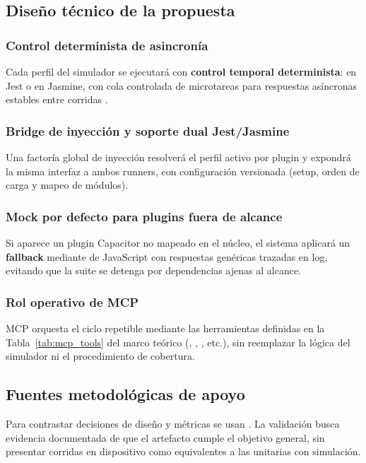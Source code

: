 \subsection{Diseño técnico de la propuesta}
\label{sec:diseno_tecnico_propuesta}
\subsubsection{Control determinista de asincronía}
\label{ssec:determinismo_asincronia}
Cada perfil del simulador se ejecutará con \textbf{control temporal determinista}:  en Jest o  en Jasmine, con cola controlada de microtareas para respuestas asíncronas estables entre corridas \cite{luo2014flaky}.

\subsubsection{Bridge de inyección y soporte dual Jest/Jasmine}
\label{ssec:bridge_inyeccion_dual}
Una factoría global de inyección resolverá el perfil activo por plugin y expondrá la misma interfaz a ambos runners, con configuración versionada (setup, orden de carga y mapeo de módulos).

\subsubsection{Mock por defecto para plugins fuera de alcance}
\label{ssec:fallback_mock}
Si aparece un plugin Capacitor no mapeado en el núcleo, el sistema aplicará un \textbf{fallback} mediante  de JavaScript con respuestas genéricas trazadas en log, evitando que la suite se detenga por dependencias ajenas al alcance.

\subsubsection{Rol operativo de MCP}
\label{ssec:justificacion_mcp_operativa}
MCP \cite{mcp-spec2025} orquesta el ciclo repetible mediante las herramientas definidas en la Tabla~\ref{tab:mcp_tools} del marco teórico (, , , etc.), sin reemplazar la lógica del simulador ni el procedimiento de cobertura.

\subsection{Fuentes metodológicas de apoyo}
\label{sec:instrumentos_biblio}
Para contrastar decisiones de diseño y métricas se usan \cite{nie2023gui_mobile_mapping,schafer2024testpilot,olsthoorn2024syntest_javascript,mcp-spec2025}. La validación busca evidencia documentada de que el artefacto cumple el objetivo general, sin presentar corridas en dispositivo como equivalentes a las unitarias con simulación.
